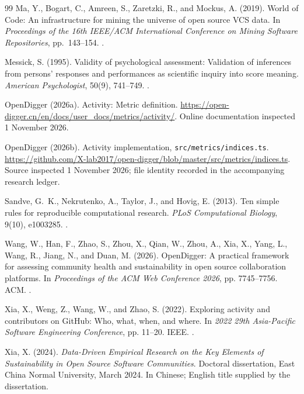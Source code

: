 \begin{thebibliography}{99}
Ma, Y., Bogart, C., Amreen, S., Zaretzki, R., and Mockus, A. (2019).
World of Code: An infrastructure for mining the universe of open source VCS data.
In \emph{Proceedings of the 16th IEEE/ACM International Conference on Mining Software Repositories}, pp.~143--154.
.

Messick, S. (1995).
Validity of psychological assessment: Validation of inferences from persons' responses and performances as scientific inquiry into score meaning.
\emph{American Psychologist}, 50(9), 741--749.
.

OpenDigger (2026a).
Activity: Metric definition.
\url{https://open-digger.cn/en/docs/user_docs/metrics/activity/}.
Online documentation inspected 1 November 2026.

OpenDigger (2026b).
Activity implementation, \texttt{src/metrics/indices.ts}.
\url{https://github.com/X-lab2017/open-digger/blob/master/src/metrics/indices.ts}.
Source inspected 1 November 2026; file identity recorded in the accompanying research ledger.

Sandve, G.~K., Nekrutenko, A., Taylor, J., and Hovig, E. (2013).
Ten simple rules for reproducible computational research.
\emph{PLoS Computational Biology}, 9(10), e1003285.
.

Wang, W., Han, F., Zhao, S., Zhou, X., Qian, W., Zhou, A., Xia, X., Yang, L., Wang, R., Jiang, N., and Duan, M. (2026).
OpenDigger: A practical framework for assessing community health and sustainability in open source collaboration platforms.
In \emph{Proceedings of the ACM Web Conference 2026}, pp. 7745--7756. ACM.
.

Xia, X., Weng, Z., Wang, W., and Zhao, S. (2022).
Exploring activity and contributors on GitHub: Who, what, when, and where.
In \emph{2022 29th Asia-Pacific Software Engineering Conference}, pp. 11--20. IEEE.
.

Xia, X. (2024).
\emph{Data-Driven Empirical Research on the Key Elements of Sustainability in Open Source Software Communities}.
Doctoral dissertation, East China Normal University, March 2024. In Chinese; English title supplied by the dissertation.


\end{thebibliography}
